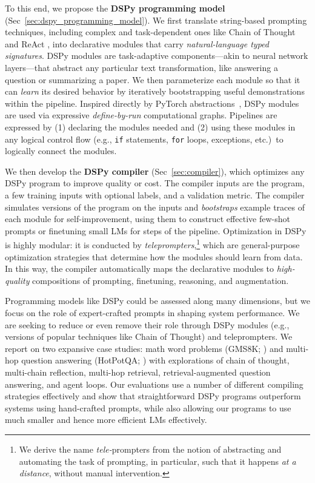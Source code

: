 To this end, we propose the \textbf{DSPy programming model} (Sec~\ref{sec:dspy_programming_model}). We first translate string-based prompting techniques, including complex and task-dependent ones like Chain of Thought \citep{wei2022chain} and ReAct \citep{yao2022react}, into declarative modules that carry \textit{natural-language typed signatures}. DSPy modules are task-adaptive components---akin to neural network layers---that abstract any particular text transformation, like answering a question or summarizing a paper. We then parameterize each module so that it can \textit{learn} its desired behavior by iteratively bootstrapping useful demonstrations within the pipeline. Inspired directly by PyTorch abstractions~\citep{pytorch2019}, DSPy modules are used via expressive \textit{define-by-run} computational graphs. Pipelines are expressed by (1) declaring the modules needed and (2) using these modules in any logical control flow (e.g., \texttt{if} statements, \texttt{for} loops, exceptions, etc.)\ to logically connect the modules.


We then develop the \textbf{DSPy compiler} (Sec~\ref{sec:compiler}), which optimizes any DSPy program to improve quality or cost. The compiler inputs are the program, a few training inputs with optional labels, and a validation metric. The compiler simulates versions of the program on the inputs and \textit{bootstraps} example traces of each module for self-improvement, using them to construct effective few-shot prompts or finetuning small LMs for steps of the pipeline. Optimization in DSPy is highly modular: it is conducted by \textit{teleprompters},\footnote{We derive the name \textit{tele-}prompters from the notion of abstracting and automating the task of prompting, in particular, such that it happens \textit{at a distance}, without manual intervention.} which are general-purpose optimization strategies that determine how the modules should learn from data. In this way, the compiler automatically maps the declarative modules to \textit{high-quality} compositions of prompting, finetuning, reasoning, and augmentation. 








Programming models like DSPy could be assessed along many dimensions, %
but %
we focus on %
the role of expert-crafted prompts in shaping system performance.
We are seeking to reduce or even remove their role through DSPy modules (e.g., versions of popular techniques like Chain of Thought) and teleprompters.
We report on two expansive case studies: math word problems (GMS8K; \citealt{cobbe2021training}) and multi-hop question answering (HotPotQA; \citealt{yang2018hotpotqa}) with explorations of chain of thought, multi-chain reflection, multi-hop retrieval, retrieval-augmented question answering, and agent loops. Our evaluations use a number of different compiling strategies effectively and show that straightforward DSPy programs outperform systems using hand-crafted prompts, while also allowing our programs to use much smaller and hence more efficient LMs effectively.




